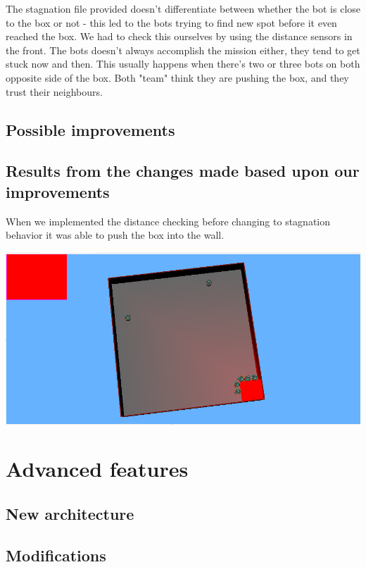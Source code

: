 \documentclass[12pt, a4paper]{article}
\begin{document}
The stagnation file provided doesn't differentiate between whether the bot is close to the box or not - this led to the bots trying to find new spot before it even reached the box. We had to check this ourselves by using the distance sensors in the front. 
The bots doesn't always accomplish the mission either, they tend to get stuck now and then. This usually happens when there's two or three bots on both opposite side of the box. Both "team" think they are pushing the box, and they trust their neighbours. 
\subsection{Possible improvements}

\subsection{Results from the changes made based upon our improvements}
When we implemented the distance checking before changing to stagnation behavior it was able to push the box into the wall.

\includegraphics[width=15cm]{1.finalState}


\section{Advanced features}

\subsection{New architecture}
\subsection{Modifications}
\end{document}
